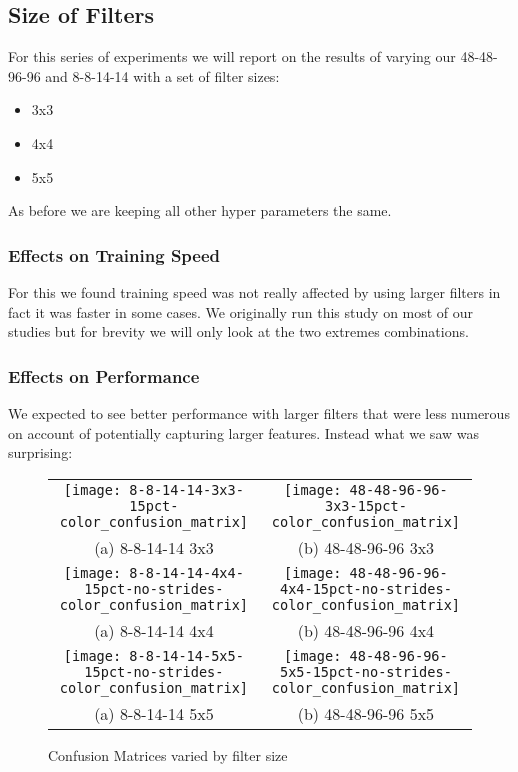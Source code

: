 \subsection{Size of Filters}
For this series of experiments we will report on the results of varying our 48-48-96-96 and 8-8-14-14 with a set of filter sizes:

\begin{itemize}
	\item 3x3
	\item 4x4
	\item 5x5
\end{itemize}

As before we are keeping all other hyper parameters the same.

\subsubsection{Effects on Training Speed}
For this we found training speed was not really affected by using larger filters in fact it was faster in some cases. We originally run this study on most of our studies but for brevity we will only look at the two extremes combinations.

\subsubsection{Effects on Performance}
We expected to see better performance with larger filters that were less numerous on account of potentially capturing larger features. Instead what we saw was surprising:

\begin{figure}
	\begin{tabular}{cc}
		\texttt{[image: 8-8-14-14-3x3-15pct-color\_confusion\_matrix]} &   \texttt{[image: 48-48-96-96-3x3-15pct-color\_confusion\_matrix]} \\
		(a) 8-8-14-14 3x3& (b) 48-48-96-96 3x3\\[6pt]
		\texttt{[image: 8-8-14-14-4x4-15pct-no-strides-color\_confusion\_matrix]} &   \texttt{[image: 48-48-96-96-4x4-15pct-no-strides-color\_confusion\_matrix]} \\
		(a) 8-8-14-14 4x4& (b) 48-48-96-96 4x4\\[6pt]
		\texttt{[image: 8-8-14-14-5x5-15pct-no-strides-color\_confusion\_matrix]} &   \texttt{[image: 48-48-96-96-5x5-15pct-no-strides-color\_confusion\_matrix]} \\
		(a) 8-8-14-14 5x5& (b) 48-48-96-96 5x5\\[6pt]
	\end{tabular}
	\caption{Confusion Matrices varied by filter size}
\end{figure}

